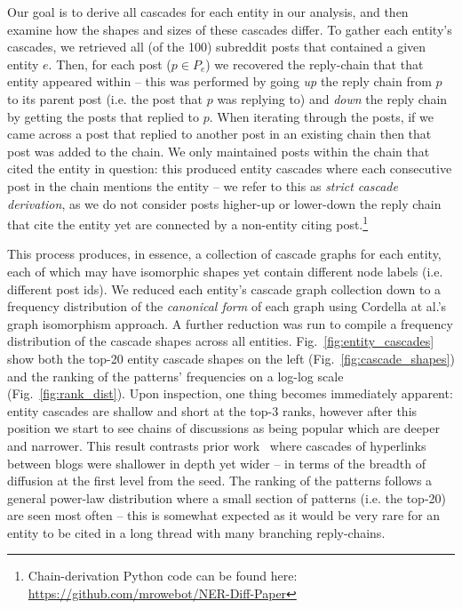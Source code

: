 \documentclass[sigconf]{acmart}
\begin{document}
Our goal is to derive all cascades for each entity in our analysis, and then examine how the shapes and sizes of these cascades differ.
To gather each entity's cascades, we retrieved all (of the 100) subreddit posts that contained a given entity $e$.
Then, for each post ($p \in P_e$) we recovered the reply-chain that that entity appeared within -- this was performed by going \emph{up} the reply chain from $p$ to its parent post (i.e. the post that $p$ was replying to) and \emph{down} the reply chain by getting the posts that replied to $p$.
When iterating through the posts, if we came across a post that replied to another post in an existing chain then that post was added to the chain.
We only maintained posts within the chain that cited the entity in question: this produced entity cascades where each consecutive post in the chain mentions the entity -- we refer to this as \emph{strict cascade derivation}, as we do not consider posts higher-up or lower-down the reply chain that cite the entity yet are connected by a non-entity citing post.\footnote{Chain-derivation Python code can be found here: \url{https://github.com/mrowebot/NER-Diff-Paper}}

This process produces, in essence, a collection of cascade graphs for each entity, each of which may have isomorphic shapes yet contain different node labels (i.e. different post ids).
We reduced each entity's cascade graph collection down to a frequency distribution of the \emph{canonical form} of each graph using Cordella at al.'s~\cite{cordella2001improved} graph isomorphism approach.
A further reduction was run to compile a frequency distribution of the cascade shapes across all entities.
Fig.~\ref{fig:entity_cascades} show both the top-20 entity cascade shapes on the left (Fig.~\ref{fig:cascade_shapes}) and the ranking of the patterns' frequencies on a log-log scale (Fig.~\ref{fig:rank_dist}).
Upon inspection, one thing becomes immediately apparent: entity cascades are shallow and short at the top-3 ranks, however after this position we start to see chains of discussions as being popular which are deeper and narrower.
This result contrasts prior work~\cite{leskovec2007patterns} where cascades of hyperlinks between blogs were shallower in depth yet wider -- in terms of the breadth of diffusion at the first level from the seed. 
The ranking of the patterns follows a general power-law distribution where a small section of patterns (i.e. the top-20) are seen most often -- this is somewhat expected as it would be very rare for an entity to be cited in a long thread with many branching reply-chains.
\end{document}
